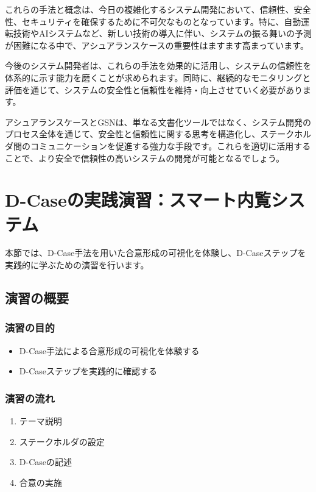 これらの手法と概念は、今日の複雑化するシステム開発において、信頼性、安全性、セキュリティを確保するために不可欠なものとなっています。特に、自動運転技術やAIシステムなど、新しい技術の導入に伴い、システムの振る舞いの予測が困難になる中で、アシュアランスケースの重要性はますます高まっています。

今後のシステム開発者は、これらの手法を効果的に活用し、システムの信頼性を体系的に示す能力を磨くことが求められます。同時に、継続的なモニタリングと評価を通じて、システムの安全性と信頼性を維持・向上させていく必要があります。

アシュアランスケースとGSNは、単なる文書化ツールではなく、システム開発のプロセス全体を通じて、安全性と信頼性に関する思考を構造化し、ステークホルダ間のコミュニケーションを促進する強力な手段です。これらを適切に活用することで、より安全で信頼性の高いシステムの開発が可能となるでしょう。

\section{D-Caseの実践演習：スマート内覧システム}

本節では、D-Case手法を用いた合意形成の可視化を体験し、D-Caseステップを実践的に学ぶための演習を行います。

\subsection{演習の概要}

\subsubsection{演習の目的}
\begin{itemize}
    \item D-Case手法による合意形成の可視化を体験する
    \item D-Caseステップを実践的に確認する
\end{itemize}

\subsubsection{演習の流れ}
\begin{enumerate}
    \item テーマ説明
    \item ステークホルダの設定
    \item D-Caseの記述
    \item 合意の実施
\end{enumerate}

